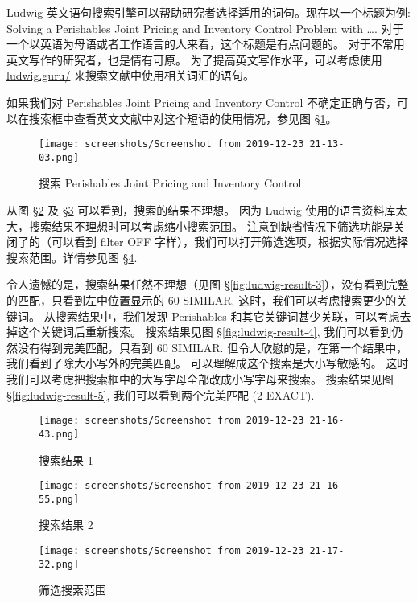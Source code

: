 \documentclass[
    11pt,
    cite=authoryear,
    device=normal,
    lang=cn,
    mode=simple,
    result=answer,
    toc=onecol,
]{elegantbook_sierxue}
\begin{document}
Ludwig 英文语句搜索引擎可以帮助研究者选择适用的词句。现在以一个标题为例:
Solving a Perishables Joint Pricing and Inventory Control Problem
with \ldots.
对于一个以英语为母语或者工作语言的人来看，这个标题是有点问题的。
对于不常用英文写作的研究者，也是情有可原。
为了提高英文写作水平，可以考虑使用
\href{https://ludwig.guru/}{ludwig.guru/} 来搜索文献中使用相关词汇的语句。

如果我们对 Perishables Joint Pricing and Inventory Control
不确定正确与否，可以在搜索框中查看英文文献中对这个短语的使用情况，参见图
\S\ref{fig:ludwig-search}。

\begin{figure}[!htbp]
  \centering
  \texttt{[image: screenshots/Screenshot from
  2019-12-23 21-13-03.png]}
  \caption{搜索 Perishables Joint Pricing and Inventory Control}
  \label{fig:ludwig-search}
\end{figure}

从图 \S\ref{fig:ludwig-result-1} 及 \S\ref{fig:ludwig-result-2}
可以看到，搜索的结果不理想。
因为 Ludwig 使用的语言资料库太大，搜索结果不理想时可以考虑缩小搜索范围。
注意到缺省情况下筛选功能是关闭了的（可以看到 filter OFF
字样），我们可以打开筛选选项，根据实际情况选择搜索范围。详情参见图
\S\ref{fig:ludwig-filter}.

令人遗憾的是，搜索结果任然不理想（见图
\S\ref{fig:ludwig-result-3}），没有看到完整的匹配，只看到左中位置显示的 60
SIMILAR.
这时，我们可以考虑搜索更少的关键词。
从搜索结果中，我们发现 Perishables
和其它关键词甚少关联，可以考虑去掉这个关键词后重新搜索。
搜索结果见图 \S\ref{fig:ludwig-result-4},
我们可以看到仍然没有得到完美匹配，只看到 60 SIMILAR.
但令人欣慰的是，在第一个结果中，我们看到了除大小写外的完美匹配。
可以理解成这个搜索是大小写敏感的。
这时我们可以考虑把搜索框中的大写字母全部改成小写字母来搜索。
搜索结果见图 \S\ref{fig:ludwig-result-5}, 我们可以看到两个完美匹配
(2 EXACT).

\begin{figure}[!htbp]
  \centering
  \texttt{[image: screenshots/Screenshot from
  2019-12-23 21-16-43.png]}
  \caption{搜索结果 1}
  \label{fig:ludwig-result-1}
\end{figure}

\begin{figure}[!htbp]
  \centering
  \texttt{[image: screenshots/Screenshot from
  2019-12-23 21-16-55.png]}
  \caption{搜索结果 2}
  \label{fig:ludwig-result-2}
\end{figure}

\begin{figure}[!htbp]
  \centering
  \texttt{[image: screenshots/Screenshot from
  2019-12-23 21-17-32.png]}
  \caption{筛选搜索范围}
  \label{fig:ludwig-filter}
\end{figure}
\end{document}
